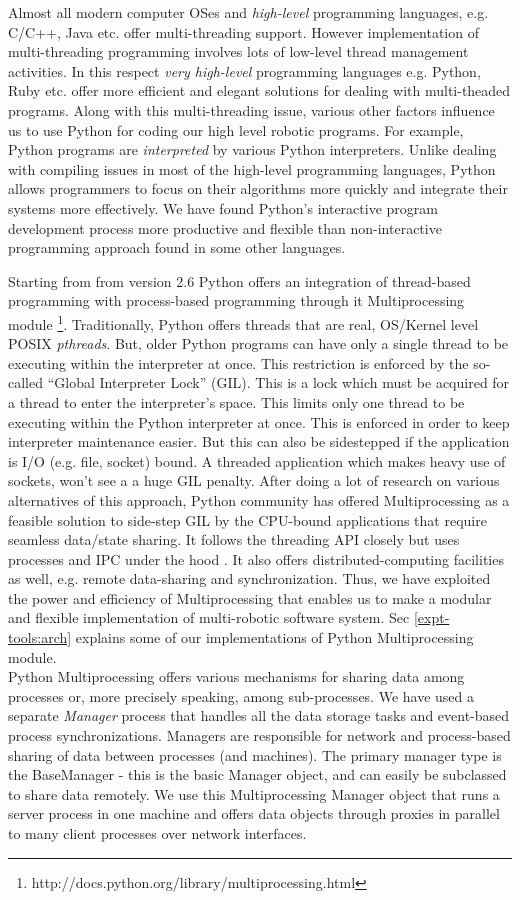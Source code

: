 Almost all modern computer OSes and {\em high-level} programming languages, e.g. C/C++, Java etc. offer multi-threading support. However implementation of multi-threading programming involves lots of low-level thread management activities. In this respect {\em very high-level
} programming languages e.g. Python, Ruby etc. offer more efficient and elegant solutions for dealing with multi-theaded programs. Along with this multi-threading issue, various other factors influence us to use Python for coding our high level robotic programs. For example, Python programs are  {\em interpreted} by various Python interpreters. Unlike dealing with compiling issues in most of the high-level programming languages, Python allows programmers to focus on their  algorithms more quickly and integrate their systems more effectively.  We have found Python's interactive program development process more productive and flexible than non-interactive programming approach found in some other languages. 

Starting from from version 2.6 Python offers an integration of thread-based programming with process-based programming through it Multiprocessing module \footnote{http://docs.python.org/library/multiprocessing.html}. Traditionally, Python offers threads that are real, OS/Kernel level POSIX {\em pthreads}.  But, older Python programs can have only a single thread to be executing within
 the interpreter at once. This restriction is enforced by the
  so-called ``Global Interpreter Lock'' (GIL). This is a lock which must be
 acquired for a thread to enter the interpreter’s space.
 This limits only one thread to  be executing within the Python
 interpreter at once.  This is enforced  in order to keep interpreter maintenance easier.
 But this can also be sidestepped if the application is I/O (e.g. file, socket) bound. A threaded application which makes heavy use of sockets, won’t see
 a a huge GIL penalty.  After  doing a lot of research on various alternatives of this approach, Python community has offered Multiprocessing as a feasible solution to side-step GIL by the CPU-bound applications that  require seamless data/state sharing.   It follows the threading API closely but uses processes and
 IPC under the hood
. It also offers distributed-computing facilities as well, e.g. remote data-sharing and synchronization.  Thus, we have exploited the power and efficiency of Multiprocessing that enables us to make a modular and flexible implementation of multi-robotic software system. Sec \ref{expt-tools:arch} explains some of our implementations of Python Multiprocessing module.\\
Python Multiprocessing offers various mechanisms for sharing data among processes or, more precisely speaking, among sub-processes. We have used a separate {\em Manager} process that handles all the data storage tasks and event-based process synchronizations.  Managers are responsible for network and process-based sharing of data between processes (and machines).
 The primary manager type is the BaseManager - this is the basic Manager object, and can easily be subclassed to share
 data remotely.  We use this Multiprocessing Manager object that runs a server process in one machine and offers data objects through proxies in parallel to many client  processes over network interfaces.
